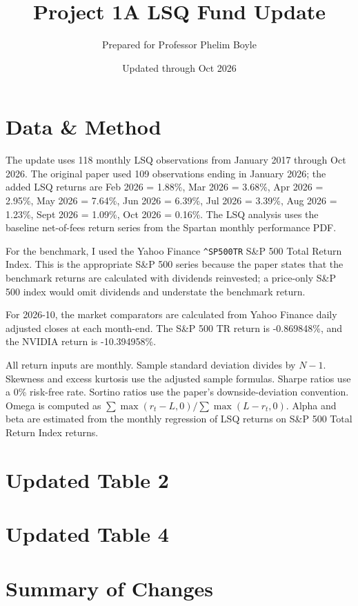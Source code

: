 \documentclass[11pt]{article}
\title{Project 1A LSQ Fund Update}
\author{Prepared for Professor Phelim Boyle}
\date{Updated through Oct 2026}
\begin{document}
\maketitle

\section*{Data \& Method}
The update uses 118 monthly LSQ observations from January 2017 through Oct 2026.
The original paper used 109 observations ending in January 2026; the added LSQ returns are Feb 2026 = 1.88\%, Mar 2026 = 3.68\%, Apr 2026 = 2.95\%, May 2026 = 7.64\%, Jun 2026 = 6.39\%, Jul 2026 = 3.39\%, Aug 2026 = 1.23\%, Sept 2026 = 1.09\%, Oct 2026 = 0.16\%.
The LSQ analysis uses the baseline net-of-fees return series from the Spartan monthly performance PDF.

For the benchmark, I used the Yahoo Finance \texttt{\string^SP500TR} S\&P 500 Total Return Index.
This is the appropriate S\&P 500 series because the paper states that the benchmark returns are calculated with dividends reinvested; a price-only S\&P 500 index would omit dividends and understate the benchmark return.

For 2026-10, the market comparators are calculated from Yahoo Finance daily adjusted closes at each month-end. The S\&P 500 TR return is -0.869848\%, and the NVIDIA return is -10.394958\%.

All return inputs are monthly.
Sample standard deviation divides by $N-1$.
Skewness and excess kurtosis use the adjusted sample formulas.
Sharpe ratios use a 0\% risk-free rate.
Sortino ratios use the paper's downside-deviation convention.
Omega is computed as $\sum \max(r_t-L,0) / \sum \max(L-r_t,0)$.
Alpha and beta are estimated from the monthly regression of LSQ returns on S\&P 500 Total Return Index returns.

\clearpage
\section*{Updated Table 2}
\setcounter{table}{1}


\clearpage
\section*{Updated Table 4}
\setcounter{table}{3}


\clearpage
\section*{Summary of Changes}
\end{document}
